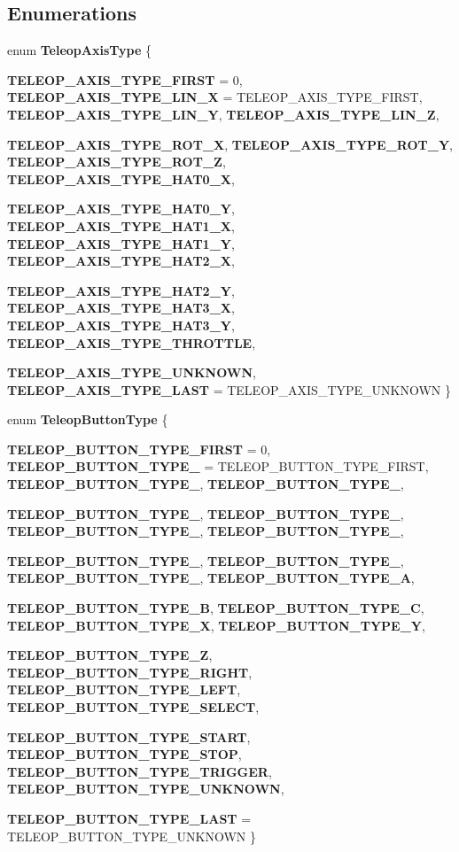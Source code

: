 \subsection*{Enumerations}
\begin{DoxyCompactItemize}
\item 
enum {\bf TeleopAxisType} \{ \par
{\bf TELEOP\_\-AXIS\_\-TYPE\_\-FIRST} =  0, 
{\bf TELEOP\_\-AXIS\_\-TYPE\_\-LIN\_\-X} =  TELEOP\_\-AXIS\_\-TYPE\_\-FIRST, 
{\bf TELEOP\_\-AXIS\_\-TYPE\_\-LIN\_\-Y}, 
{\bf TELEOP\_\-AXIS\_\-TYPE\_\-LIN\_\-Z}, 
\par
{\bf TELEOP\_\-AXIS\_\-TYPE\_\-ROT\_\-X}, 
{\bf TELEOP\_\-AXIS\_\-TYPE\_\-ROT\_\-Y}, 
{\bf TELEOP\_\-AXIS\_\-TYPE\_\-ROT\_\-Z}, 
{\bf TELEOP\_\-AXIS\_\-TYPE\_\-HAT0\_\-X}, 
\par
{\bf TELEOP\_\-AXIS\_\-TYPE\_\-HAT0\_\-Y}, 
{\bf TELEOP\_\-AXIS\_\-TYPE\_\-HAT1\_\-X}, 
{\bf TELEOP\_\-AXIS\_\-TYPE\_\-HAT1\_\-Y}, 
{\bf TELEOP\_\-AXIS\_\-TYPE\_\-HAT2\_\-X}, 
\par
{\bf TELEOP\_\-AXIS\_\-TYPE\_\-HAT2\_\-Y}, 
{\bf TELEOP\_\-AXIS\_\-TYPE\_\-HAT3\_\-X}, 
{\bf TELEOP\_\-AXIS\_\-TYPE\_\-HAT3\_\-Y}, 
{\bf TELEOP\_\-AXIS\_\-TYPE\_\-THROTTLE}, 
\par
{\bf TELEOP\_\-AXIS\_\-TYPE\_\-UNKNOWN}, 
{\bf TELEOP\_\-AXIS\_\-TYPE\_\-LAST} =  TELEOP\_\-AXIS\_\-TYPE\_\-UNKNOWN
 \}
\item 
enum {\bf TeleopButtonType} \{ \par
{\bf TELEOP\_\-BUTTON\_\-TYPE\_\-FIRST} =  0, 
{\bf TELEOP\_\-BUTTON\_\-TYPE\_} =  TELEOP\_\-BUTTON\_\-TYPE\_\-FIRST, 
{\bf TELEOP\_\-BUTTON\_\-TYPE\_}, 
{\bf TELEOP\_\-BUTTON\_\-TYPE\_}, 
\par
{\bf TELEOP\_\-BUTTON\_\-TYPE\_}, 
{\bf TELEOP\_\-BUTTON\_\-TYPE\_}, 
{\bf TELEOP\_\-BUTTON\_\-TYPE\_}, 
{\bf TELEOP\_\-BUTTON\_\-TYPE\_}, 
\par
{\bf TELEOP\_\-BUTTON\_\-TYPE\_}, 
{\bf TELEOP\_\-BUTTON\_\-TYPE\_}, 
{\bf TELEOP\_\-BUTTON\_\-TYPE\_}, 
{\bf TELEOP\_\-BUTTON\_\-TYPE\_\-A}, 
\par
{\bf TELEOP\_\-BUTTON\_\-TYPE\_\-B}, 
{\bf TELEOP\_\-BUTTON\_\-TYPE\_\-C}, 
{\bf TELEOP\_\-BUTTON\_\-TYPE\_\-X}, 
{\bf TELEOP\_\-BUTTON\_\-TYPE\_\-Y}, 
\par
{\bf TELEOP\_\-BUTTON\_\-TYPE\_\-Z}, 
{\bf TELEOP\_\-BUTTON\_\-TYPE\_\-RIGHT}, 
{\bf TELEOP\_\-BUTTON\_\-TYPE\_\-LEFT}, 
{\bf TELEOP\_\-BUTTON\_\-TYPE\_\-SELECT}, 
\par
{\bf TELEOP\_\-BUTTON\_\-TYPE\_\-START}, 
{\bf TELEOP\_\-BUTTON\_\-TYPE\_\-STOP}, 
{\bf TELEOP\_\-BUTTON\_\-TYPE\_\-TRIGGER}, 
{\bf TELEOP\_\-BUTTON\_\-TYPE\_\-UNKNOWN}, 
\par
{\bf TELEOP\_\-BUTTON\_\-TYPE\_\-LAST} =  TELEOP\_\-BUTTON\_\-TYPE\_\-UNKNOWN
 \}
\end{DoxyCompactItemize}
